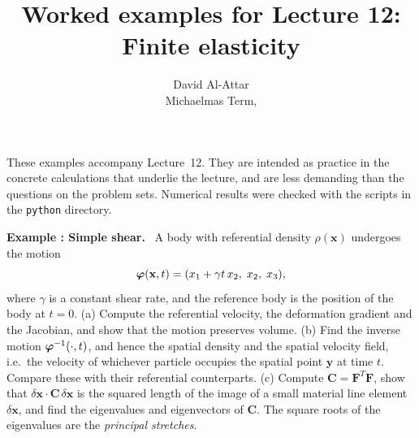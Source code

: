 \documentclass[a4paper,12pt]{paper}
\title{Worked examples for Lecture 12: Finite elasticity}
\author{David Al-Attar \\ Michaelmas Term, \the\year}
\newcounter{example}
\renewenvironment{example}[1]{%
  \refstepcounter{example}%
  \begin{mdframed}[linewidth=1pt,innertopmargin=6pt,innerbottommargin=6pt]%
  \noindent\textbf{Example \theexample: #1.}\ }{%
  \end{mdframed}}
\begin{document}
\maketitle

\noindent These examples accompany Lecture~12. They are intended as practice in the concrete
calculations that underlie the lecture, and are less demanding than the questions on the
problem sets. Numerical results were checked with the scripts in the \texttt{python}
directory.

\begin{example}{Simple shear}
A body with referential density $\rho(\mathbf{x})$ undergoes the motion
\begin{equation*}
\bm{\varphi}(\mathbf{x},t)=(x_{1}+\gamma t\,x_{2},\;x_{2},\;x_{3}),
\end{equation*}
where $\gamma$ is a constant shear rate, and the reference body is the position of the body at
$t=0$. (a) Compute the referential velocity, the deformation gradient and the Jacobian, and
show that the motion preserves volume. (b) Find the inverse motion $\bm{\varphi}^{-1}(\cdot,t)$, and
hence the spatial density and the spatial velocity field, i.e.\ the velocity of whichever
particle occupies the spatial point $\mathbf{y}$ at time $t$. Compare these with their
referential counterparts. (c) Compute $\mathbf{C}=\mathbf{F}^{T}\mathbf{F}$, show that
$\delta\mathbf{x}\cdot\mathbf{C}\,\delta\mathbf{x}$ is the squared length of the image of a
small material line element $\delta\mathbf{x}$, and find the eigenvalues and eigenvectors of
$\mathbf{C}$. The square roots of the eigenvalues are the \emph{principal stretches}.
\end{example}
\end{document}
